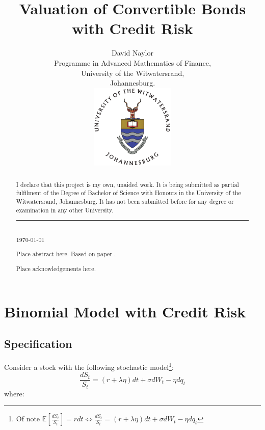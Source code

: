 \documentclass[a4paper,11pt,oneside]{report}
\title{Valuation of Convertible Bonds with Credit Risk}
\author{David Naylor\\[2cm]
Programme in Advanced Mathematics of Finance,\\
University of the Witwatersrand,\\
Johannesburg.\\[2cm]
\includegraphics[width=4cm]{../common/WitsColourLogo}\\[2cm]
}
\newcommand{\setlinespacing}[1]
           {\renewcommand{\baselinestretch}{#1}\small\normalsize}
\theoremstyle{plain}
\theoremstyle{definition}
\def\S{\ensuremath{S_t}\xspace}
\def\dS{\ensuremath{dS_t}\xspace}
\def\dt{\ensuremath{dt}\xspace}
\def\dW{\ensuremath{dW_t}\xspace}
\def\dq{\ensuremath{dq_t}\xspace}
\begin{document}
\maketitle \setlinespacing{1.20}


\def\abstractname{\Huge Declaration}
\begin{abstract}
I declare that this project is my own, unaided work. It is being submitted as partial fulfilment of the Degree of Bachelor of Science with Honours in the University of the Witwatersrand, Johannesburg. It has not been submitted before for any degree or examination in any other University.\\[3cm]
\noindent\rule{5cm}{0.5pt}\\[1cm]
\noindent \today
\end{abstract}


\def\abstractname{\Huge Abstract}
\begin{abstract}
Place abstract here.  Based on paper \cite{AFV03}.
\end{abstract}


\def\abstractname{\Huge Acknowledgements}
\begin{abstract}
Place acknowledgements here.
\end{abstract}


\setlinespacing{1}
\tableofcontents
\listoffigures
\listoftables
\clearpage
\setlinespacing{1.20}
\setcounter{page}{1}


\chapter{Binomial Model with Credit Risk}
\section{Specification}
Consider a stock with the following stochastic model\footnote{Of note $\mathbb{E}[\frac{\dS}{\S}] = r\dt \Leftrightarrow \frac{\dS}{\S} = (r + \lambda\eta)\dt + \sigma\dW - \eta\dq$}:
\begin{displaymath}
 \frac{\dS}{\S} = (r + \lambda\eta)\dt + \sigma\dW - \eta\dq
\end{displaymath}
where:
\end{document}

